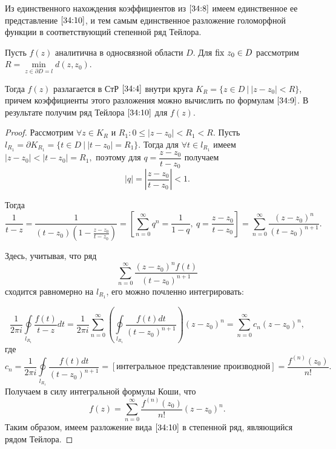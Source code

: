 \documentclass[../../main.tex]{subfiles}
\begin{document}
Из единственного нахождения коэффициентов из $ \eqref{34:8} $ имеем 
единственное ее представление $ \eqref{34:10} $, и тем самым единственное 
разложение голоморфной функции в соответствующий степенной ряд Тейлора.

\begin{thm}
	Пусть $ f(z) $ аналитична в односвязной области $ D $. Для $ \operatorname{fix}\, z_0 \in D 
	$ рассмотрим $ R = \underset{z \in \partial D = l}{\min}d(z, z_0) $.
	
	Тогда $ f(z) $ разлагается в СтР $ \eqref{34:4} $ внутри круга $ K_R = \{z 
	\in D\ |\ |z - z_0| < R \} $, причем коэффициенты этого разложения можно 
	вычислить по формулам $ \eqref{34:9} $.
	В результате получим ряд Тейлора $ \eqref{34:10} $ для $f(z)$.
\end{thm}

\begin{proof}
	Рассмотрим $ \forall z \in K_R $ и $R_1 : 0 \le |z - z_0| < R_1 < R$.
	Пусть $ l_{R_1} = \partial K_{R_1} = \{t \in D\ |\ |t - z_0| = R_1 \} $. 
	Тогда для $ \forall t \in l_{R_1} $ имеем
	$ |z - z_0| < |t - z_0| = R_1, $
	поэтому для $ q = \dfrac{z - z_0}{t - z_0} $ получаем
	\[ |q| = \left|\frac{z - z_0}{t - z_0}\right| < 1. \]
	
	Тогда
	\[ \frac{1}{t - z} = \frac{1}{(t - z_0)(1 - \frac{z - z_0}{t - z_0})} = 
	\left[ \sum\limits_{n = 0}^{\infty}q^n = \frac{1}{1 - q},\ q = \frac{z - 
	z_0}{t - z_0} \right] = \sum\limits_{n = 0}^{\infty}\frac{(z - z_0)^n}{(t - 
	z_0)^{n + 1}}. \]
	
	Здесь, учитывая, что ряд
	\[ \sum\limits_{n = 0}^{\infty}\frac{(z - z_0)^n f(t)}{(t - z_0)^{n + 1}} \]
	сходится равномерно на $ l_{R_1} $, его можно почленно интегрировать:
	
	\[ \frac{1}{2 \pi i} \underset{l_{R_1}}\oint \frac{f(t)}{t - z} dt = 
	\frac{1}{2 \pi i} \sum\limits_{n = 0}^{\infty} \left( 
	\underset{l_{R_1}}\oint\frac{f(t)dt}{(t - z_0)^{n + 1}} \right)(z - z_0)^n = 
	\sum\limits_{n = 0}^{\infty} c_n (z - z_0)^n, \]
	где
	\[ c_n = \frac{1}{2 \pi i} \underset{l_{R_1}}\oint\frac{f(t)dt}{(t - z_0)^{n 
	+ 
	1}} = [\text{интегральное представление производной}] = 
	\frac{f^{(n)}(z_0)}{n!}. \]
	Получаем в силу интегральной формулы Коши, что
	\[ f(z) = \sum\limits_{n = 0}^{\infty} \frac{f^{(n)}(z_0)}{n!} (z - z_0)^n. \]
	Таким образом, имеем разложение вида $ \eqref{34:10} $ в степенной ряд, 
	являющийся рядом 
	Тейлора.
 \end{proof}
\end{document}
